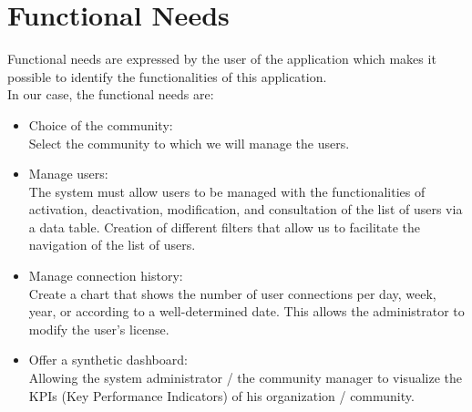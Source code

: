 \section{Functional Needs}
Functional needs are expressed by the user of the application
which makes it possible to identify the functionalities of this application.\\
In our
case, the functional needs are:
\begin{itemize}
\item Choice of the community:\\
Select the community to which we will manage the users.

\item Manage users:\\
The system must allow users to be managed with the functionalities of activation,
deactivation, modification, and consultation of the list of users via a data table.
Creation of different filters that allow us to facilitate the navigation of the list of users.

\item Manage connection history:\\
Create a chart that shows the number of user connections per day, week, year, or
according to a well-determined date. This allows the administrator to modify the user’s license.


\item Offer a synthetic dashboard:\\
Allowing the system administrator / the community manager to visualize the KPIs (Key Performance Indicators) of his organization / community.


\end{itemize}
